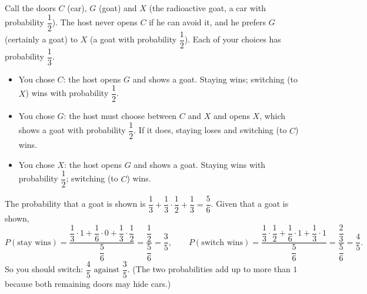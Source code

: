 Call the doors $C$ (car), $G$ (goat) and $X$ (the radioactive goat, a car with probability $\dfrac{1}{2}$). The host never opens $C$ if he can avoid it, and he prefers $G$ (certainly a goat) to $X$ (a goat with probability $\dfrac{1}{2}$). Each of your choices has probability $\dfrac{1}{3}$.
\begin{itemize}
\item You chose $C$: the host opens $G$ and shows a goat. Staying wins; switching (to $X$) wins with probability $\dfrac{1}{2}$.
\item You chose $G$: the host must choose between $C$ and $X$ and opens $X$, which shows a goat with probability $\dfrac{1}{2}$. If it does, staying loses and switching (to $C$) wins.
\item You chose $X$: the host opens $G$ and shows a goat. Staying wins with probability $\dfrac{1}{2}$; switching (to $C$) wins.
\end{itemize}
The probability that a goat is shown is $\dfrac{1}{3}+\dfrac{1}{3}\cdot\dfrac{1}{2}+\dfrac{1}{3}=\dfrac{5}{6}$. Given that a goat is shown,
\[
P(\text{stay wins})=\dfrac{\dfrac{1}{3}\cdot1+\dfrac{1}{6}\cdot0+\dfrac{1}{3}\cdot\dfrac{1}{2}}{\dfrac{5}{6}}=\dfrac{\dfrac{1}{2}}{\dfrac{5}{6}}=\dfrac{3}{5},\qquad
P(\text{switch wins})=\dfrac{\dfrac{1}{3}\cdot\dfrac{1}{2}+\dfrac{1}{6}\cdot1+\dfrac{1}{3}\cdot1}{\dfrac{5}{6}}=\dfrac{\dfrac{2}{3}}{\dfrac{5}{6}}=\dfrac{4}{5} .
\]
So you should $\boxed{\text{switch: }\dfrac{4}{5}\text{ against }\dfrac{3}{5}}$. (The two probabilities add up to more than $1$ because both remaining doors may hide cars.)
